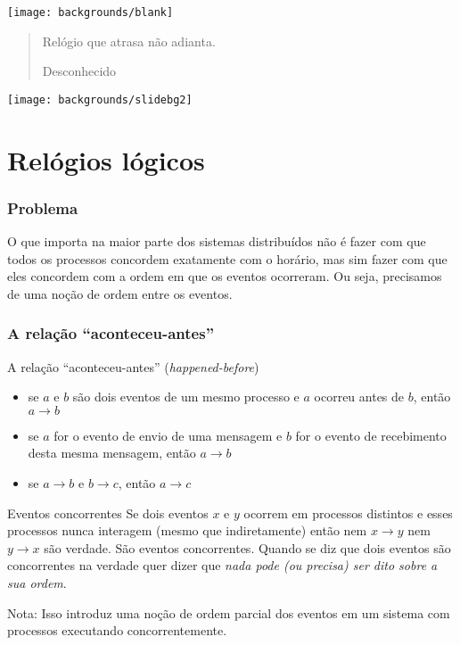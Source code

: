 \documentclass[Ligatures=TeX,table,brazil,svgnames,usetotalslideindicator,compress,10pt]{beamer}
\newcommand{\setintersectionbg}{
  \setbeamertemplate{background}
  {\texttt{[image: backgrounds/blank]}}
}
\newcommand{\setsectionbg}{
  \setbeamertemplate{background}
  {\texttt{[image: backgrounds/slidebg2]}}
}
\begin{document}
\setintersectionbg
\begin{frame}[standout]
    \begin{quotation}
      Relógio que atrasa não adianta.
    \begin{flushright}
      \alert{Desconhecido}
    \end{flushright}
  \end{quotation}
\end{frame}
\setsectionbg

\section{Relógios lógicos}

\begin{frame}
  \frametitle{Problema}
  \begin{alertblock}{}
    O que importa na maior parte dos sistemas distribuídos não é fazer
    com que todos os processos concordem exatamente com o horário, mas
    sim fazer com que eles concordem com \alert{a ordem em que os
      eventos ocorreram}. Ou seja, precisamos de uma noção de ordem
    entre os eventos.
  \end{alertblock}
\end{frame}

\begin{frame}
  \frametitle{A relação ``aconteceu-antes''}

  \begin{block}{A relação ``aconteceu-antes'' (\textit{happened-before})}
    \begin{itemize}[<+->]
    \item se $a$ e $b$ são dois eventos de um mesmo processo e $a$ ocorreu antes de $b$, então $a \rightarrow b$
    \item se $a$ for o evento de envio de uma mensagem e $b$ for o evento de recebimento desta mesma mensagem, então $a \rightarrow b$
    \item se $a \rightarrow b$ e $b \rightarrow c$, então $a \rightarrow c$
    \end{itemize}
  \end{block}
  \pause
  \begin{block}{Eventos concorrentes}
  Se dois eventos $x$ e $y$ ocorrem em processos distintos e
  esses processos nunca interagem (mesmo que indiretamente) então nem
  $x \rightarrow y$ nem $y \rightarrow x$ são verdade. São
  eventos \alert{concorrentes}. Quando se diz que dois eventos são
  concorrentes na verdade quer dizer que \emph{nada pode (ou precisa) ser
    dito sobre a sua ordem}.
  \end{block}
  \pause
  \begin{alertblock}{Nota:}
    Isso introduz uma noção de \alert{ordem parcial dos eventos} em um sistema com processos executando concorrentemente.
  \end{alertblock}

\end{frame}
\end{document}
